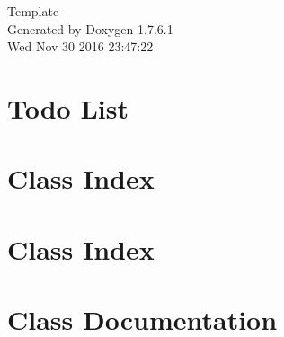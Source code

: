 \documentclass[a4paper]{book}
\begin{document}
\hypersetup{pageanchor=false,citecolor=blue}
\begin{titlepage}
\vspace*{7cm}
\begin{center}
{\Large \-Template }\\
\vspace*{1cm}
{\large \-Generated by Doxygen 1.7.6.1}\\
\vspace*{0.5cm}
{\small Wed Nov 30 2016 23:47:22}\\
\end{center}
\end{titlepage}
\clearemptydoublepage
{}
\tableofcontents
\clearemptydoublepage
{}
\hypersetup{pageanchor=true,citecolor=blue}
\chapter{\-Todo \-List}
\label{todo}
\hypertarget{todo}{}

\chapter{\-Class \-Index}

\chapter{\-Class \-Index}

\chapter{\-Class \-Documentation}




























\printindex
\end{document}
